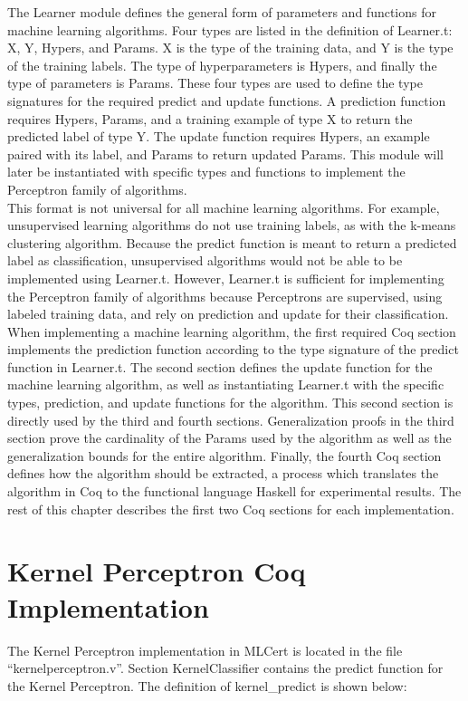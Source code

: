 The Learner module defines the general form of parameters and functions for machine learning algorithms. Four types are listed in the definition of Learner.t: X, Y, Hypers, and Params. X is the type of the training data, and Y is the type of the training labels. The type of hyperparameters is Hypers, and finally the type of parameters is Params. These four types are used to define the type signatures for the required predict and update functions. A prediction function requires Hypers, Params, and a training example of type X to return the predicted label of type Y. The update function requires Hypers, an example paired with its label, and Params to return updated Params. This module will later be instantiated with specific types and functions to implement the Perceptron family of algorithms. 
\\This format is not universal for all machine learning algorithms. For example, unsupervised learning algorithms do not use training labels, as with the k-means clustering algorithm. Because the predict function is meant to return a predicted label as classification, unsupervised algorithms would not be able to be implemented using Learner.t. However, Learner.t is sufficient for implementing the Perceptron family of algorithms because Perceptrons are supervised, using labeled training data, and rely on prediction and update for their classification.
\\When implementing a machine learning algorithm, the first required Coq section implements the prediction function according to the type signature of the predict function in Learner.t. The second section defines the update function for the machine learning algorithm, as well as instantiating Learner.t with the specific types, prediction, and update functions for the algorithm. This second section is directly used by the third and fourth sections. Generalization proofs in the third section prove the cardinality of the Params used by the algorithm as well as the generalization bounds for the entire algorithm. Finally, the fourth Coq section defines how the algorithm should be extracted, a process which translates the algorithm in Coq to the functional language Haskell for experimental results. The rest of this chapter describes the first two Coq sections for each implementation.
\section{Kernel Perceptron Coq Implementation}\label{KPCoqImp}
The Kernel Perceptron implementation in MLCert is located in the file ``kernelperceptron.v''. Section KernelClassifier contains the predict function for the Kernel Perceptron. The definition of kernel\_predict is shown below:

